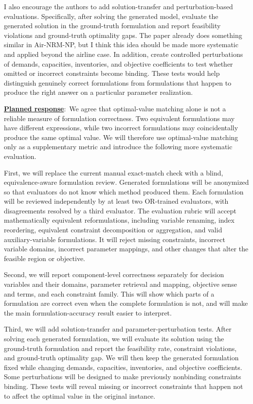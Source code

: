 \documentclass[11pt]{article}
\newcommand{\planned}{\noindent\underline{\textbf{Planned response}}:\ }
\begin{document}
\begin{enumerate}[label=(AssoE.\arabic*),leftmargin=*]
\begin{enumerate}[label=(R1.Major.\arabic*),leftmargin=*]
{I also encourage the authors to add solution-transfer and perturbation-based evaluations. Specifically, after solving the generated model, evaluate the generated solution in the ground-truth formulation and report feasibility violations and ground-truth optimality gaps. The paper already does something similar in Air-NRM-NP, but I think this idea should be made more systematic and applied beyond the airline case. In addition, create controlled perturbations of demands, capacities, inventories, and objective coefficients to test whether omitted or incorrect constraints become binding. These tests would help distinguish genuinely correct formulations from formulations that happen to produce the right answer on a particular parameter realization.}\label{R1-major-2}

\planned We agree that optimal-value matching alone is not a reliable measure
of formulation correctness. Two equivalent formulations may have different
expressions, while two incorrect formulations may coincidentally produce the
same optimal value. We will therefore use optimal-value matching only as a
supplementary metric and introduce the following more systematic evaluation.

First, we will replace the current manual exact-match check with a blind,
equivalence-aware formulation review. Generated formulations will be
anonymized so that evaluators do not know which method produced them. Each
formulation will be reviewed independently by at least two OR-trained
evaluators, with disagreements resolved by a third evaluator. The evaluation
rubric will accept mathematically equivalent reformulations, including
variable renaming, index reordering, equivalent constraint decomposition or
aggregation, and valid auxiliary-variable formulations. It will reject
missing constraints, incorrect variable domains, incorrect parameter
mappings, and other changes that alter the feasible region or objective.

Second, we will report component-level correctness separately for decision
variables and their domains, parameter retrieval and mapping, objective sense
and terms, and each constraint family. This will show which parts of a
formulation are correct even when the complete formulation is not, and will
make the main formulation-accuracy result easier to interpret.

Third, we will add solution-transfer and parameter-perturbation tests. After
solving each generated formulation, we will evaluate its solution using the
ground-truth formulation and report the feasibility rate, constraint
violations, and ground-truth optimality gap. We will then keep the generated
formulation fixed while changing demands, capacities, inventories, and
objective coefficients. Some perturbations will be designed to make
previously nonbinding constraints binding. These tests will reveal missing or
incorrect constraints that happen not to affect the optimal value in the
original instance.


\end{enumerate}
\end{enumerate}
\end{document}

